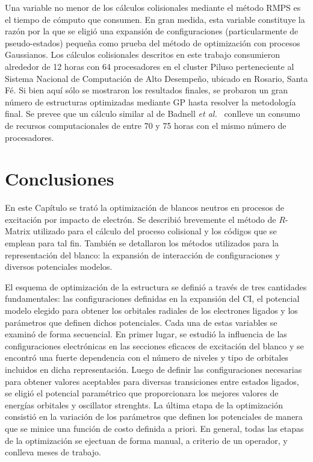 Una variable no menor de los cálculos colisionales mediante el método 
RMPS es el tiempo de cómputo que consumen. En gran medida, 
esta variable constituye la razón por la que se eligió una expansión de 
configuraciones (particularmente de pseudo-estados) pequeña como prueba 
del método de optimización con procesos Gaussianos. Los cálculos 
colisionales descritos en este trabajo consumieron alrededor de 12 horas 
con 64 procesadores en el cluster Piluso perteneciente al Sistema 
Nacional de Computación de Alto Desempeño, ubicado en Rosario, Santa Fé. 
Si bien aquí sólo se mostraron los resultados finales, se probaron un 
gran número de estructuras optimizadas mediante GP hasta resolver la 
metodología final. Se prevee que un cálculo similar al de Badnell 
\textit{et al.}~\cite{Be_Ballance:03} conlleve un consumo de recursos 
computacionales de entre 70 y 75 horas con el mismo número de 
procesadores. 

\section{Conclusiones}
\label{sec:conclu-rmatrix}

En este Capítulo se trató la optimización de blancos neutros en procesos 
de excitación por impacto de electrón. Se describió brevemente el método 
de $R$-Matrix utilizado para el cálculo del proceso colisional y los 
códigos que se emplean para tal fin. También se detallaron los métodos 
utilizados para la representación del blanco: la expansión de 
interacción de configuraciones y diversos potenciales modelos. 

El esquema de optimización de la estructura se definió a través de tres 
cantidades fundamentales: las configuraciones definidas en la expansión 
del CI, el potencial modelo elegido para obtener los orbitales radiales 
de los electrones ligados y los parámetros que definen dichos 
potenciales. Cada una de estas variables se examinó de forma secuencial. 
En primer lugar, se estudió la influencia de las configuraciones 
electrónicas en las secciones eficaces de excitación del blanco y se 
encontró una fuerte dependencia con el número de niveles y tipo de 
orbitales incluidos en dicha representación. Luego de definir las 
configuraciones necesarias para obtener valores aceptables para diversas
transiciones entre estados ligados, se eligió el potencial paramétrico 
que proporcionara los mejores valores de energías orbitales y oscillator 
strenghts. La última etapa de la optimización consistió en la variación
de los parámetros que definen los potenciales de manera que se minice
una función de costo definida a priori. En general, todas las etapas de
la optimización se ejectuan de forma manual, a criterio de un operador, 
y conlleva meses de trabajo. 

